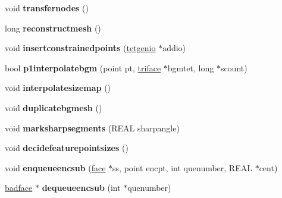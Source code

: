 \begin{DoxyCompactItemize}
\item 
\hypertarget{classtetgenmesh_aca4cdd18ce8662d83d00f3be302e594d}{void {\bfseries transfernodes} ()}\label{classtetgenmesh_aca4cdd18ce8662d83d00f3be302e594d}

\item 
\hypertarget{classtetgenmesh_a630450ae1a4d84143813d2993017132a}{long {\bfseries reconstructmesh} ()}\label{classtetgenmesh_a630450ae1a4d84143813d2993017132a}

\item 
\hypertarget{classtetgenmesh_ab859365ca3dd3eafb77fac56d0ae3a03}{void {\bfseries insertconstrainedpoints} (\hyperlink{classtetgenio}{tetgenio} $\ast$addio)}\label{classtetgenmesh_ab859365ca3dd3eafb77fac56d0ae3a03}

\item 
\hypertarget{classtetgenmesh_a214440a8ddb1d0cb6064cc27f136d0f3}{bool {\bfseries p1interpolatebgm} (point pt, \hyperlink{classtetgenmesh_1_1triface}{triface} $\ast$bgmtet, long $\ast$scount)}\label{classtetgenmesh_a214440a8ddb1d0cb6064cc27f136d0f3}

\item 
\hypertarget{classtetgenmesh_a8784c691b687b9832eb1072a2bd11a11}{void {\bfseries interpolatesizemap} ()}\label{classtetgenmesh_a8784c691b687b9832eb1072a2bd11a11}

\item 
\hypertarget{classtetgenmesh_a34f8ddf701303c03d2f10f7e6dc35e44}{void {\bfseries duplicatebgmesh} ()}\label{classtetgenmesh_a34f8ddf701303c03d2f10f7e6dc35e44}

\item 
\hypertarget{classtetgenmesh_a82b5421e86b96cd99827b9af4b75bf5e}{void {\bfseries marksharpsegments} (R\-E\-A\-L sharpangle)}\label{classtetgenmesh_a82b5421e86b96cd99827b9af4b75bf5e}

\item 
\hypertarget{classtetgenmesh_a40f5e58f4811597ca34ecab3567aa41b}{void {\bfseries decidefeaturepointsizes} ()}\label{classtetgenmesh_a40f5e58f4811597ca34ecab3567aa41b}

\item 
\hypertarget{classtetgenmesh_ab6e6c8268250142b533b8ea7b2b7ffc7}{void {\bfseries enqueueencsub} (\hyperlink{classtetgenmesh_1_1face}{face} $\ast$ss, point encpt, int quenumber, R\-E\-A\-L $\ast$cent)}\label{classtetgenmesh_ab6e6c8268250142b533b8ea7b2b7ffc7}

\item 
\hypertarget{classtetgenmesh_a755976d86fe8a68ef4713f5782755ccb}{\hyperlink{structtetgenmesh_1_1badface}{badface} $\ast$ {\bfseries dequeueencsub} (int $\ast$quenumber)}\label{classtetgenmesh_a755976d86fe8a68ef4713f5782755ccb}


\end{DoxyCompactItemize}
